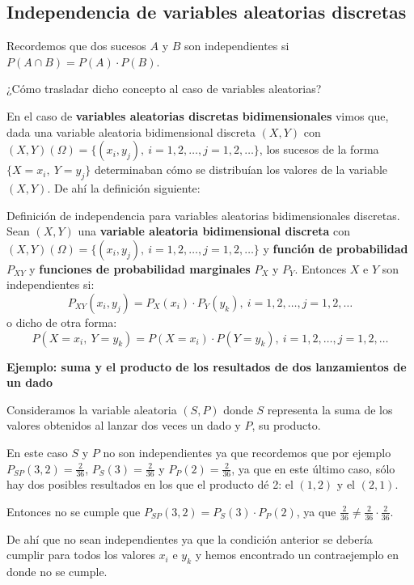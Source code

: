 \documentclass[]{book}
\begin{document}
\hypertarget{independencia-de-variables-aleatorias-discretas}{%
\subsection{Independencia de variables aleatorias discretas}\label{independencia-de-variables-aleatorias-discretas}}

Recordemos que dos sucesos \(A\) y \(B\) son independientes si \(P(A\cap B)=P(A)\cdot P(B)\).

¿Cómo trasladar dicho concepto al caso de variables aleatorias?

En el caso de \textbf{variables aleatorias discretas bidimensionales} vimos que, dada una variable aleatoria bidimensional discreta \((X,Y)\) con \((X,Y)(\Omega)=\{(x_i,y_j),\ i=1,2,\ldots,j=1,2,\ldots\}\), los sucesos de la forma \(\{X=x_i,\  Y=y_j\}\) determinaban cómo se distribuían los valores de la variable \((X,Y)\). De ahí la definición siguiente:

Definición de independencia para variables aleatorias bidimensionales discretas.
Sean \((X,Y)\) una \textbf{variable aleatoria bidimensional discreta} con \((X,Y)(\Omega)=\{(x_i,y_j),\ i=1,2,\ldots,j=1,2,\ldots\}\) y \textbf{función de probabilidad} \(P_{XY}\) y \textbf{funciones de probabilidad marginales} \(P_X\) y \(P_Y\). Entonces \(X\) e \(Y\) son independientes si:
\[
P_{XY}(x_i,y_j)=P_X(x_i)\cdot P_Y(y_k),\ i=1,2,\ldots,j=1,2,\ldots
\]
o dicho de otra forma:
\[
P(X=x_i,\ Y=y_k)=P(X=x_i)\cdot P(Y=y_k),\ i=1,2,\ldots,j=1,2,\ldots
\]

\textbf{Ejemplo: suma y el producto de los resultados de dos lanzamientos de un dado}

Consideramos la variable aleatoria \((S,P)\) donde \(S\) representa la suma de los valores obtenidos al lanzar dos veces un dado y \(P\), su producto.

En este caso \(S\) y \(P\) no son independientes ya que recordemos que por ejemplo \(P_{SP}(3,2)=\frac{2}{36}\), \(P_S(3)=\frac{2}{36}\) y \(P_P(2)=\frac{2}{36}\), ya que en este último caso, sólo hay dos posibles resultados en los que el producto dé 2: el \((1,2)\) y el \((2,1)\).

Entonces no se cumple que \(P_{SP}(3,2)=P_S(3)\cdot P_P(2)\), ya que \(\frac{2}{36}\neq \frac{2}{36}\cdot \frac{2}{36}\).

De ahí que no sean independientes ya que la condición anterior se debería cumplir para todos los valores \(x_i\) e \(y_k\) y hemos encontrado un contraejemplo en donde no se cumple.
\end{document}
